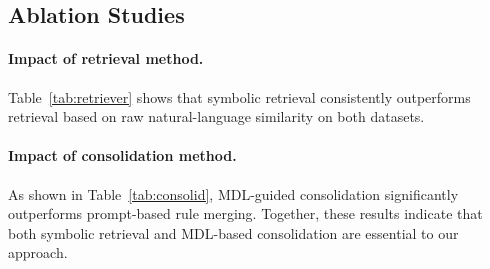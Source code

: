 \subsection{Ablation Studies}

\paragraph{Impact of retrieval method.}
Table~\ref{tab:retriever} shows that symbolic retrieval consistently outperforms retrieval
based on raw natural-language similarity on both datasets.

\paragraph{Impact of consolidation method.}

As shown in Table~\ref{tab:consolid}, MDL-guided consolidation significantly outperforms
prompt-based rule merging. Together, these results indicate that both symbolic retrieval
and MDL-based consolidation are essential to our approach.
